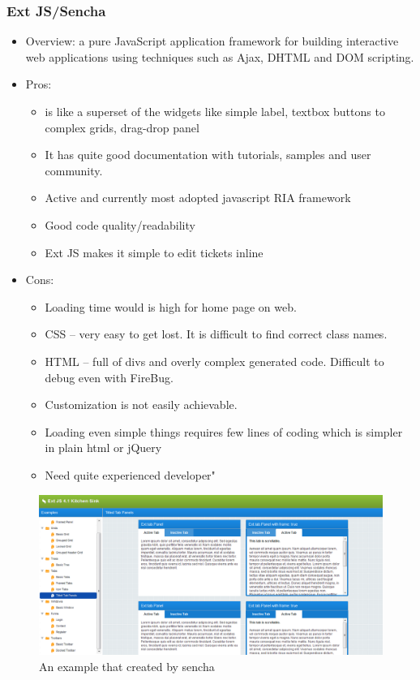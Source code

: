 \documentclass[14pt,a4paper]{extreport}
\begin{document}
		\subsubsection{Ext JS/Sencha}
			\begin{itemize}
				\item Overview:  a pure JavaScript application framework for building interactive web applications using techniques such as Ajax, DHTML and DOM scripting.
				\item Pros: 
					\begin{itemize}
						\item is like a superset of the widgets like simple label, textbox buttons to complex grids, drag-drop panel
						\item It has quite good documentation with tutorials, samples and user community.
						\item Active and currently most adopted javascript RIA framework
						\item  Good code quality/readability
						\item  Ext JS makes it simple to edit tickets inline
					\end{itemize}
				\item Cons:
					\begin{itemize}
						\item Loading time would is high for home page on web.
						\item CSS – very easy to get lost. It is difficult to find correct class names.
						\item HTML – full of divs and overly complex generated code. Difficult to debug even with FireBug.
						\item  Customization is not easily achievable.
						\item Loading even simple things requires few lines of coding which is simpler in plain html or jQuery
						\item Need quite experienced developer"
					\end{itemize}
			\end{itemize}
			
			\begin{figure}
				\begin{center}
				\includegraphics[scale=0.5]{sencha.png}
				\caption{An example that created by sencha}
				\end{center}
			\end{figure}
			
\end{document}
